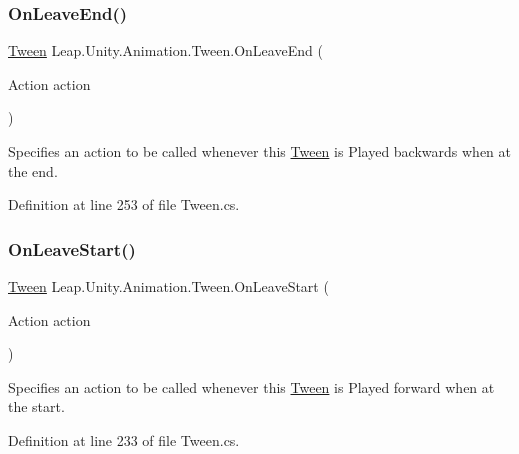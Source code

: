 \subsubsection{\texorpdfstring{OnLeaveEnd()}{OnLeaveEnd()}}
{\footnotesize\ttfamily \mbox{\hyperlink{struct_leap_1_1_unity_1_1_animation_1_1_tween}{Tween}} Leap.\+Unity.\+Animation.\+Tween.\+On\+Leave\+End (\begin{DoxyParamCaption}\item[{Action}]{action }\end{DoxyParamCaption})}



Specifies an action to be called whenever this \mbox{\hyperlink{struct_leap_1_1_unity_1_1_animation_1_1_tween}{Tween}} is Played backwards when at the end. 



Definition at line 253 of file Tween.\+cs.

\mbox{\label{struct_leap_1_1_unity_1_1_animation_1_1_tween_a6aa4eb20bcc8295adee7afc50e8fe731}} 
\subsubsection{\texorpdfstring{OnLeaveStart()}{OnLeaveStart()}}
{\footnotesize\ttfamily \mbox{\hyperlink{struct_leap_1_1_unity_1_1_animation_1_1_tween}{Tween}} Leap.\+Unity.\+Animation.\+Tween.\+On\+Leave\+Start (\begin{DoxyParamCaption}\item[{Action}]{action }\end{DoxyParamCaption})}



Specifies an action to be called whenever this \mbox{\hyperlink{struct_leap_1_1_unity_1_1_animation_1_1_tween}{Tween}} is Played forward when at the start. 



Definition at line 233 of file Tween.\+cs.

\mbox{\label{struct_leap_1_1_unity_1_1_animation_1_1_tween_a2f1e2df07793b5a7c397184cedeaca02}} 
